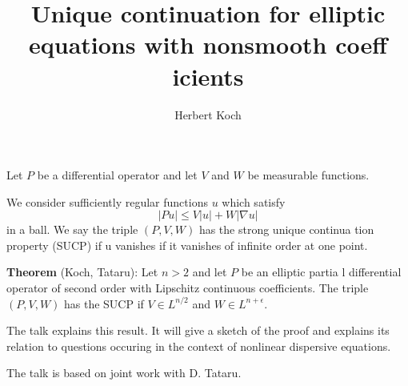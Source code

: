 \documentclass[12pt]{article}
\title{Unique continuation for elliptic equations with nonsmooth coeff
icients}
\author{Herbert Koch}
\begin{document}
\maketitle


Let $P$ be a
differential operator  and  let  $V$ and  $W$ be measurable functions.

We consider   sufficiently regular functions $u$  which satisfy
\[  |Pu|    \le     V |u| + W |\nabla u | \]
in a ball. We say the triple $(P,V,W)$ has the  strong unique continua
tion property (SUCP)
if u vanishes if it vanishes of infinite order at one point.

\bigskip

{\bf
Theorem} (Koch, Tataru): Let $n > 2$ and let $P$ be an elliptic partia
l differential operator
of second order with Lipschitz continuous coefficients.
The triple $(P,V,W)$ has the SUCP
if $V  \in L^{n/2}$  and $W \in L^{n+\epsilon}$.

\bigskip

The talk explains this result. It will  give a sketch of the proof
and explains its relation to questions occuring in the context of
nonlinear dispersive equations.



\noindent The talk is based  on  joint work with D. Tataru.
\end{document}
